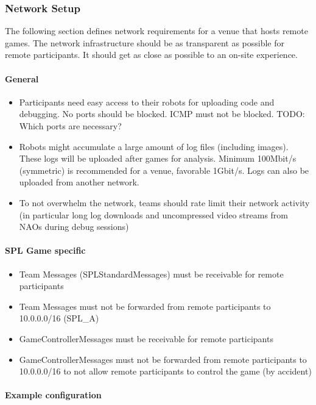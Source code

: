 \subsubsection{Network Setup}
The following section defines network requirements for a venue that hosts remote games. The network infrastructure should be as transparent as possible for remote participants. It should get as close as possible to an on-site experience.

\paragraph{General}

\begin{itemize}
    \item Participants need easy access to their robots for uploading code and debugging. No ports should be blocked. ICMP must not be blocked. TODO: Which ports are necessary?
    \item Robots might accumulate a large amount of log files (including images). These logs will be uploaded after games for analysis. Minimum 100Mbit/s (symmetric) is recommended for a venue, favorable 1Gbit/s. Logs can also be uploaded from another network.
    \item To not overwhelm the network, teams should rate limit their network activity (in particular long log downloads and uncompressed video streams from NAOs during debug sessions)
\end{itemize}

\paragraph{SPL Game specific}

\begin{itemize}
    \item Team Messages (SPLStandardMessages) must be receivable for remote participants
    \item Team Messages must not be forwarded from remote participants to 10.0.0.0/16 (SPL\_A)
    \item GameControllerMessages must be receivable for remote participants
    \item GameControllerMessages must not be forwarded from remote participants to 10.0.0.0/16 to not allow remote participants to control the game (by accident)
\end{itemize}

\paragraph{Example configuration}


